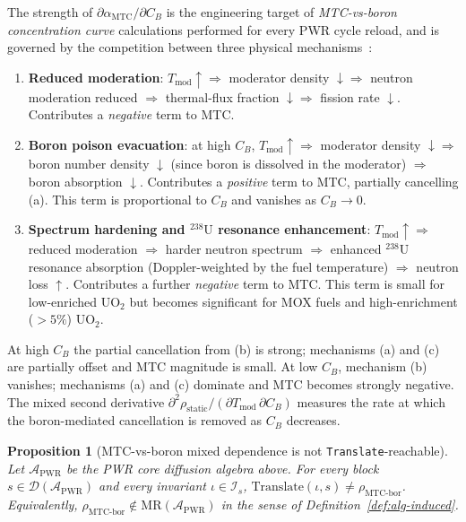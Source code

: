 \documentclass[manuscript]{acmart}
\newtheorem{proposition}{Proposition}
\begin{document}
The strength of $\partial \alpha_{\mathrm{MTC}}/\partial C_{B}$ is the engineering target of \emph{MTC-vs-boron concentration curve} calculations performed for every PWR cycle reload, and is governed by the competition between three physical mechanisms~\cite[\S3.4]{Stacey2007}:
\begin{enumerate}[nosep,leftmargin=*]
  \item[(a)] \textbf{Reduced moderation}: $T_{\mathrm{mod}} \uparrow \Rightarrow$ moderator density $\downarrow \Rightarrow$ neutron moderation reduced $\Rightarrow$ thermal-flux fraction $\downarrow \Rightarrow$ fission rate $\downarrow$. Contributes a \emph{negative} term to MTC.
  \item[(b)] \textbf{Boron poison evacuation}: at high $C_{B}$, $T_{\mathrm{mod}} \uparrow \Rightarrow$ moderator density $\downarrow \Rightarrow$ boron number density $\downarrow$ (since boron is dissolved in the moderator) $\Rightarrow$ boron absorption $\downarrow$. Contributes a \emph{positive} term to MTC, partially cancelling (a). This term is proportional to $C_{B}$ and vanishes as $C_{B} \to 0$.
  \item[(c)] \textbf{Spectrum hardening and $^{238}\mathrm{U}$ resonance enhancement}: $T_{\mathrm{mod}} \uparrow \Rightarrow$ reduced moderation $\Rightarrow$ harder neutron spectrum $\Rightarrow$ enhanced $^{238}\mathrm{U}$ resonance absorption (Doppler-weighted by the fuel temperature) $\Rightarrow$ neutron loss $\uparrow$. Contributes a further \emph{negative} term to MTC. This term is small for low-enriched UO$_{2}$ but becomes significant for MOX fuels and high-enrichment ($>5\%$) UO$_{2}$.
\end{enumerate}

At high $C_{B}$ the partial cancellation from (b) is strong; mechanisms (a) and (c) are partially offset and MTC magnitude is small. At low $C_{B}$, mechanism (b) vanishes; mechanisms (a) and (c) dominate and MTC becomes strongly negative. The mixed second derivative $\partial^{2}\rho_{\mathrm{static}}/(\partial T_{\mathrm{mod}}\,\partial C_{B})$ measures the rate at which the boron-mediated cancellation is removed as $C_{B}$ decreases.

\begin{proposition}[MTC-vs-boron mixed dependence is not \texttt{Translate}-reachable]
\label{prop:mtcbor}
Let $\mathcal{A}_{\mathrm{PWR}}$ be the PWR core diffusion algebra above. For every block $s \in \mathcal{D}(\mathcal{A}_{\mathrm{PWR}})$ and every invariant $\iota \in \mathcal{I}_{s}$, $\mathrm{Translate}(\iota, s) \neq \rho_{\mathrm{MTC\text{-}bor}}$. Equivalently, $\rho_{\mathrm{MTC\text{-}bor}} \notin \mathrm{MR}(\mathcal{A}_{\mathrm{PWR}})$ in the sense of Definition~\ref{def:alg-induced}.
\end{proposition}
\end{document}

